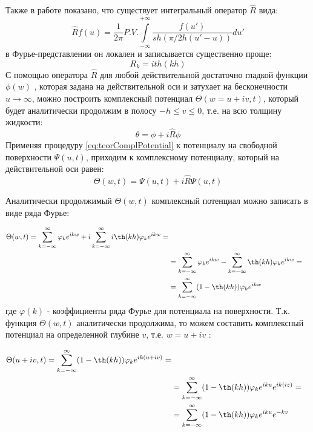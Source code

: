 Также в работе \cite{DiachZK1996} показано, что существует интегральный оператор $\hat{R}$ вида:
\begin{equation}\label{eq:intR}
\hat{R}f(u)=\frac{1}{2\pi}P.V.\int\limits_{-\infty}^{+\infty}\frac{f(u')}{sh(\pi/2h(u'-u))}du'
\end{equation}
в Фурье-представлении он локален и записывается существенно проще:
\begin{equation}\label{eq:intR_fourie}
R_k=ith(kh)
\end{equation}
С помощью оператора $\hat{R}$  для любой действительной достаточно гладкой функции $\phi(w)$ , которая задана на действительной оси и затухает на бесконечности $u\rightarrow\infty$, можно построить комплексный потенциал $\Theta(w=u+iv,t)$, который будет аналитически продолжим в полосу $-h\leq v\leq0$, т.е. на всю толщину жидкости:
\begin{equation}\label{eq:teorComplPotential}
\theta=\phi+i\hat{R}\phi
\end{equation}
Применяя процедуру \eqref{eq:teorComplPotential} к потенциалу на свободной поверхности  $\Psi(u,t)$, приходим к комплексному потенциалу, который на действительной оси равен:
\begin{equation}\label{eq:myComplPotential}
\Theta(w,t)=\Psi(u,t)+i\hat{R}\Psi(u,t)
\end{equation}

Аналитически продолжимый $\Theta(w,t)$ комплексный потенциал   можно записать в виде ряда Фурье:

\begin{equation}\label{eq:MainResult}
\begin{split}
\Theta(w,t) = \sum\limits_{k=-\infty}^{\infty}\varphi_ke^{ikw}+i\sum\limits_{k=-\infty}^{\infty}i\th(kh)\varphi_ke^{ikw}=\\
&=\sum\limits_{k=-\infty}^{\infty}\varphi_ke^{ikw}-\sum\limits_{k=-\infty}^{\infty}\th(kh)\varphi_ke^{ikw}=\\
&=\sum\limits_{k=-\infty}^{\infty}(1-\th(kh))\varphi_ke^{ikw}
\end{split}
\end{equation}
где  $\varphi(k)$ - коэффициенты ряда Фурье для потенциала на поверхности.
Т.к.  функция $\Theta(w,t)$  аналитически продолжима, то можем составить комплексный потенциал на определенной глубине $v$, т.е. $w=u+iv$ :

\begin{equation}\label{eq:MainResult_1}
\begin{split}
\Theta(u+iv,t) = \sum\limits_{k=-\infty}^{\infty}(1-\th(kh))\varphi_ke^{ik(u+iv)}=\\
&=\sum\limits_{k=-\infty}^{\infty}(1-\th(kh))\varphi_ke^{iku}e^{ik(iz)}=\\
&=\sum\limits_{k=-\infty}^{\infty}(1-\th(kh))\varphi_ke^{iku}e^{-kv}
\end{split}
\end{equation}


